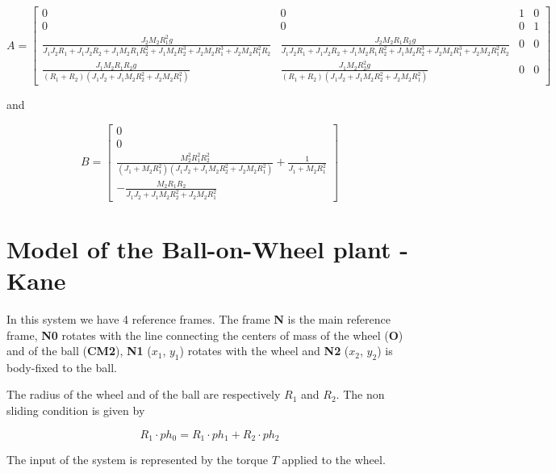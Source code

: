 $$
A=\left[\begin{smallmatrix}0 & 0 & 1 & 0\\0 & 0 & 0 & 1\\\frac{J_{2} M_{2} 
R_{1}^{2} g}{J_{1} J_{2} R_{1} + J_{1} J_{2} R_{2} + J_{1} M_{2} R_{1} 
R_{2}^{2} + J_{1} M_{2} R_{2}^{3} + J_{2} M_{2} R_{1}^{3} + J_{2} M_{2} 
R_{1}^{2} R_{2}} & \frac{J_{2} M_{2} R_{1} R_{2} g}{J_{1} J_{2} R_{1} + J_{1} 
J_{2} R_{2} + J_{1} M_{2} R_{1} R_{2}^{2} + J_{1} M_{2} R_{2}^{3} + J_{2} M_{2} 
R_{1}^{3} + J_{2} M_{2} R_{1}^{2} R_{2}} & 0 & 0\\\frac{J_{1} M_{2} R_{1} R_{2} 
g}{\left(R_{1} + R_{2}\right) \left(J_{1} J_{2} + J_{1} M_{2} R_{2}^{2} + J_{2} 
M_{2} R_{1}^{2}\right)} & \frac{J_{1} M_{2} R_{2}^{2} g}{\left(R_{1} + 
R_{2}\right) \left(J_{1} J_{2} + J_{1} M_{2} R_{2}^{2} + J_{2} M_{2} 
R_{1}^{2}\right)} & 0 & 0\end{smallmatrix}\right]
$$

and

$$
B=\left[\begin{smallmatrix}0\\0\\\frac{M_{2}^{2} R_{1}^{2} 
R_{2}^{2}}{\left(J_{1} + M_{2} R_{1}^{2}\right) \left(J_{1} J_{2} + J_{1} M_{2} 
R_{2}^{2} + J_{2} M_{2} R_{1}^{2}\right)} + \frac{1}{J_{1} + M_{2} 
R_{1}^{2}}\\- \frac{M_{2} R_{1} R_{2}}{J_{1} J_{2} + J_{1} M_{2} R_{2}^{2} + 
J_{2} M_{2} R_{1}^{2}}\end{smallmatrix}\right]
$$

\section{Model of the Ball-on-Wheel plant - Kane}

In this system we have 4 reference frames. The frame \textbf{N} is the main 
reference frame, \textbf{N0} rotates with the line connecting the centers of 
mass of the wheel (\textbf{O}) and of the ball (\textbf{CM2}), \textbf{N1} 
($x_1$, $y_1$) rotates with the wheel and \textbf{N2} ($x_2$, $y_2$) is 
body-fixed to the ball.

The radius of the wheel and of the ball are respectively $R_1$ and $R_2$. The 
non sliding condition is given by

$$
R_1 \cdot ph_0=R_1 \cdot ph_1 + R_2 \cdot ph_2
$$

The input of the system is represented by the torque $T$ applied to the wheel.

